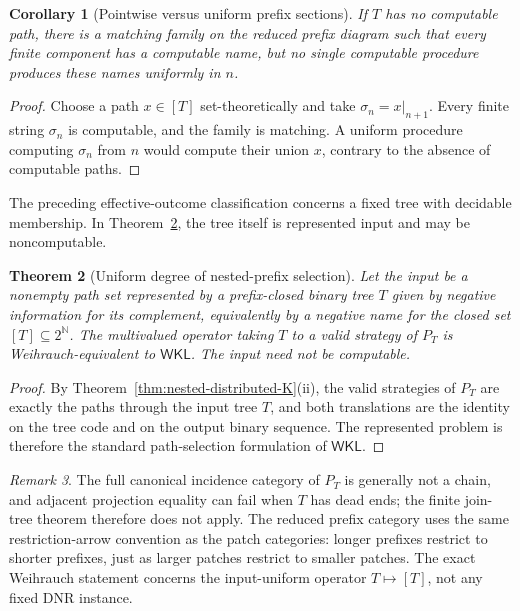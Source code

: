 \documentclass[11pt]{article}
\theoremstyle{plain}
\newtheorem{theorem}{Theorem}[section]
\newtheorem{corollary}[theorem]{Corollary}
\theoremstyle{definition}
\theoremstyle{remark}
\newtheorem{remark}[theorem]{Remark}
\newcommand{\N}{\mathbb{N}}
\begin{document}
\begin{corollary}[Pointwise versus uniform prefix sections]
\label{cor:nested-nonuniform}
If $T$ has no computable path, there is a matching family on the reduced prefix
diagram such that every finite component has a computable name, but no single
computable procedure produces these names uniformly in $n$.
\end{corollary}

\begin{proof}
Choose a path $x\in[T]$ set-theoretically and take
$\sigma_n=x|_{n+1}$. Every finite string $\sigma_n$ is computable, and the
family is matching. A uniform procedure computing $\sigma_n$ from $n$ would
compute their union $x$, contrary to the absence of computable paths.
\end{proof}

The preceding effective-outcome classification concerns a fixed tree with
decidable membership. In Theorem~\ref{thm:nested-WKL}, the tree itself is
represented input and may be noncomputable.

\begin{theorem}[Uniform degree of nested-prefix selection]
\label{thm:nested-WKL}
Let the input be a nonempty path set represented by a prefix-closed binary tree
$T$ given by negative information for its complement, equivalently by a negative
name for the closed set $[T]\subseteq2^\N$. The multivalued operator taking $T$
to a valid strategy of $P_T$ is Weihrauch-equivalent to $\mathsf{WKL}$. The
input need not be computable.
\end{theorem}

\begin{proof}
By Theorem~\ref{thm:nested-distributed-K}(ii), the valid strategies of $P_T$ are
exactly the paths through the input tree $T$, and both translations are the
identity on the tree code and on the output binary sequence. The represented
problem is therefore the standard path-selection formulation of
$\mathsf{WKL}$.
\end{proof}

\begin{remark}
The full canonical incidence category of $P_T$ is generally not a chain, and adjacent
projection equality can fail when $T$ has dead ends; the finite join-tree
theorem therefore does not apply. The reduced prefix category uses the same
restriction-arrow convention as the patch categories: longer prefixes restrict to
shorter prefixes, just as larger patches restrict to smaller patches. The exact
Weihrauch statement concerns the input-uniform operator $T\mapsto[T]$, not any
fixed DNR instance.
\end{remark}
\end{document}
